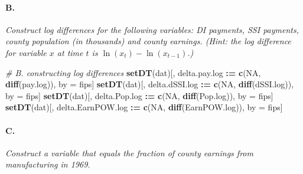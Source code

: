 \documentclass[
]{article}
\newenvironment{Shaded}{\begin{snugshade}}{\end{snugshade}}
\newcommand{\CommentTok}[1]{\textcolor[rgb]{0.56,0.35,0.01}{\textit{#1}}}
\newcommand{\DataTypeTok}[1]{\textcolor[rgb]{0.13,0.29,0.53}{#1}}
\newcommand{\DecValTok}[1]{\textcolor[rgb]{0.00,0.00,0.81}{#1}}
\newcommand{\ErrorTok}[1]{\textcolor[rgb]{0.64,0.00,0.00}{\textbf{#1}}}
\newcommand{\KeywordTok}[1]{\textcolor[rgb]{0.13,0.29,0.53}{\textbf{#1}}}
\newcommand{\NormalTok}[1]{#1}
\newcommand{\OperatorTok}[1]{\textcolor[rgb]{0.81,0.36,0.00}{\textbf{#1}}}
\newcommand{\OtherTok}[1]{\textcolor[rgb]{0.56,0.35,0.01}{#1}}
\newcommand{\StringTok}[1]{\textcolor[rgb]{0.31,0.60,0.02}{#1}}
\begin{document}
\hypertarget{b.-5}{%
\paragraph{B.}\label{b.-5}}

\textit{Construct log differences for the following variables: DI payments, SSI payments, county population (in thousands) and county earnings. (Hint: the log difference for variable $x$ at time $t$ is $\ln(x_t) − \ln(x_{t−1})$.)}

\begin{Shaded}
\begin{Highlighting}[]
\CommentTok{# B. constructing log differences }
\KeywordTok{setDT}\NormalTok{(dat)[, delta.pay.log }\OperatorTok{:}\ErrorTok{=}\StringTok{ }\KeywordTok{c}\NormalTok{(}\OtherTok{NA}\NormalTok{, }\KeywordTok{diff}\NormalTok{(pay.log)), by =}\StringTok{ }\NormalTok{fips]}
\KeywordTok{setDT}\NormalTok{(dat)[, delta.dSSI.log }\OperatorTok{:}\ErrorTok{=}\StringTok{ }\KeywordTok{c}\NormalTok{(}\OtherTok{NA}\NormalTok{, }\KeywordTok{diff}\NormalTok{(dSSI.log)), by =}\StringTok{ }\NormalTok{fips]}
\KeywordTok{setDT}\NormalTok{(dat)[, delta.Pop.log }\OperatorTok{:}\ErrorTok{=}\StringTok{ }\KeywordTok{c}\NormalTok{(}\OtherTok{NA}\NormalTok{, }\KeywordTok{diff}\NormalTok{(Pop.log)), by =}\StringTok{ }\NormalTok{fips]}
\KeywordTok{setDT}\NormalTok{(dat)[, delta.EarnPOW.log }\OperatorTok{:}\ErrorTok{=}\StringTok{ }\KeywordTok{c}\NormalTok{(}\OtherTok{NA}\NormalTok{, }\KeywordTok{diff}\NormalTok{(EarnPOW.log)), by =}\StringTok{ }\NormalTok{fips]}
\end{Highlighting}
\end{Shaded}

\hypertarget{c.-4}{%
\paragraph{C.}\label{c.-4}}

\textit{Construct a variable that equals the fraction of county earnings from manufacturing in 1969.}

\begin{Shaded}
\end{Shaded}
\end{document}
